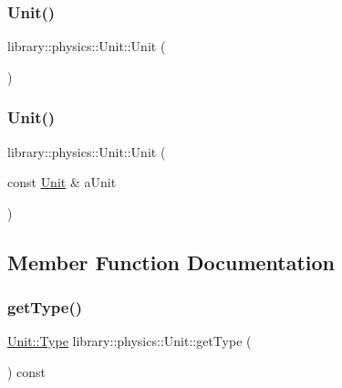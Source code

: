 \subsubsection{\texorpdfstring{Unit()}{Unit()}\hspace{0.1cm}{\footnotesize\ttfamily [1/2]}}
{\footnotesize\ttfamily library\+::physics\+::\+Unit\+::\+Unit (\begin{DoxyParamCaption}{ }\end{DoxyParamCaption})\hspace{0.3cm}{\ttfamily [delete]}}

\mbox{\label{classlibrary_1_1physics_1_1_unit_a14a1b42d1d979179e04983218bd1e061}} 
\subsubsection{\texorpdfstring{Unit()}{Unit()}\hspace{0.1cm}{\footnotesize\ttfamily [2/2]}}
{\footnotesize\ttfamily library\+::physics\+::\+Unit\+::\+Unit (\begin{DoxyParamCaption}\item[{const \hyperlink{classlibrary_1_1physics_1_1_unit}{Unit} \&}]{a\+Unit }\end{DoxyParamCaption})}



\subsection{Member Function Documentation}
\mbox{\label{classlibrary_1_1physics_1_1_unit_ac924d3a1abe03ba3ee0a05fdb3f1115f}} 
\subsubsection{\texorpdfstring{get\+Type()}{getType()}}
{\footnotesize\ttfamily \hyperlink{classlibrary_1_1physics_1_1_unit_ab01b0024991fd80f3e5ef7c8282fccc1}{Unit\+::\+Type} library\+::physics\+::\+Unit\+::get\+Type (\begin{DoxyParamCaption}{ }\end{DoxyParamCaption}) const}

